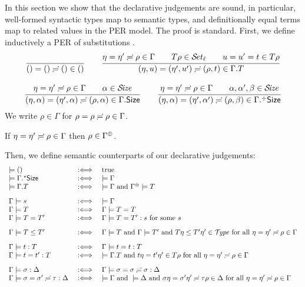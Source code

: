 \documentclass[acmlarge,review,anonymous]{acmart}\settopmatter{printfolios=true}
\begin{document}
In this section we show that the declarative judgements are sound, in
particular, well-formed syntactic types map to semantic types, and
definitionally equal terms map to related values in the PER model.
The proof is standard.  First, we define inductively a
PER of substitutions
.
\begin{gather*}
  \ru{
    }{\sempty = \sempty \eeq \sempty \in \cempty}
\qquad
  \ru{\eta = \eta' \eeq \rho \in \Gamma \qquad
      T\rho \in \SET[\ell] \qquad
      u = u' = t \in T \rho
    }{\sext \eta u = \sext{\eta'}{u'} \eeq \sext{\rho}{t} \in \cext \Gamma T}
\\[2ex]
  \ru{\eta = \eta' \eeq \rho \in \Gamma \qquad \alpha \in \SIZE
    }{\sext \eta \alpha = \sext{\eta'}{\alpha} \eeq \sext{\rho}{\alpha} \in \cext \Gamma \Size}
\qquad
  \ru{\eta = \eta' \eeq \rho \in \Gamma \qquad \alpha,\alpha',\beta \in \SIZE
    }{\sext \eta \alpha = \sext{\eta'}{\alpha'} \eeq \sext{\rho}{\beta} \in \erext \Gamma \Size}
\end{gather*}
We write $\rho \in \Gamma$ for $\rho = \rho \risingdotseq \rho \in \Gamma$.
\begin{lemma}[Resurrection]
  \label{lem:resenv}
  If\/ $\eta = \eta' \risingdotseq \rho \in \Gamma$ then $\rho \in \resurrect\Gamma$.
\end{lemma}

Then, we define semantic counterparts of our declarative judgements:
\[
\begin{array}{l@{\quad}l@{\quad}l}
  \models () & \defas & \mtrue \\
  \models \eext \Gamma \Size & \defas & \models \Gamma \\
  \models \cext \Gamma T     & \defas & \models \Gamma \mand \resurrect\Gamma \models T
\\[2ex]
  \Gamma \models s & \defas & \models \Gamma \\
  \Gamma \models T & \defas & \Gamma \models T = T \\
  \Gamma \models T = T' & \defas & \Gamma \models T = T' : s \mforsome s %
\\[2ex]
  \Gamma \models T \leq T' & \defas & \Gamma \models T \mand \Gamma \models T' \mand
    T\eta \leq T'\eta' \in \TYPE
    \mforall \eta = \eta' \eeq \rho \in \Gamma
\\[2ex]
  \Gamma \models t : T & \defas & \Gamma \models t = t : T \\
  \Gamma \models t = t' : T & \defas & %
    \models \cext \Gamma T \mand
    t \eta = t' \eta' \in T \rho \mforall \eta = \eta' \eeq \rho \in \Gamma
\\[2ex]
  \Gamma \models \sigma : \Delta & \defas & \Gamma \models \sigma = \sigma \eeq \sigma : \Delta \\
  \Gamma \models \sigma = \sigma' \eeq \tau : \Delta & \defas &
    \models \Gamma \mand \models \Delta \mand
    \sigma \eta = \sigma' \eta' \eeq \tau \rho \in \Delta
    \mforall \eta = \eta' \eeq \rho \in \Gamma
\end{array}
\]
\end{document}
